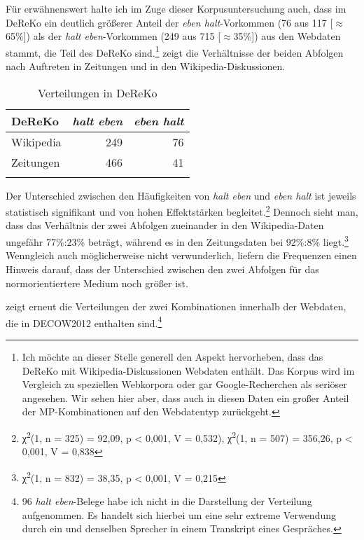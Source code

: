 Für erwähnenswert halte ich im Zuge dieser Korpusuntersuchung auch, dass im DeReKo ein deutlich größerer Anteil der \textit{eben halt}-Vorkommen (76 aus 117 [$\approx$65\%]) als der \textit{halt eben}-Vorkommen (249 aus 715 [$\approx$35\%]) aus den Webdaten stammt, die Teil des DeReKo sind.\footnote{Ich möchte an dieser Stelle generell den Aspekt hervorheben, dass das DeReKo mit Wikipedia-Diskussionen Webdaten enthält. Das Korpus wird im Vergleich zu speziellen Webkorpora oder gar Google-Recherchen als seriöser angesehen. Wir sehen hier aber, dass auch in diesen Daten ein großer Anteil der MP-Kom\-bi\-na\-ti\-on\-en auf den Webdatentyp zurückgeht.}  zeigt die Verhältnisse der beiden Abfolgen nach Auftreten in Zeitungen und in den Wikipedia-Diskussionen.

\begin{table}
\caption{\label{tab:624}Verteilungen in DeReKo}
     \begin{tabular}{lrr}
     \lsptoprule
     DeReKo & \textit{halt eben} & \textit{eben halt}\\\midrule
     Wikipedia & 249 & 76\\
     Zeitungen & 466 & 41\\
     \lspbottomrule
     \end{tabular}
\end{table}
Der Unterschied zwischen den Häufigkeiten von \textit{halt eben} und \textit{eben halt} ist je\-weils statistisch signifikant und von hohen Effektstärken begleitet.\footnote{χ\textsuperscript{2}(1, n = 325) = 92,09, p < 0,001, V = 0,532), χ\textsuperscript{2}(1, n = 507) = 356,26, p < 0,001, V = 0,838} Dennoch sieht man, dass das Verhältnis der zwei Abfolgen zueinander in den Wikipedia-Daten ungefähr 77\%:23\% beträgt, während es in den Zeitungsdaten bei 92\%:8\% liegt.\footnote{χ\textsuperscript{2}(1, n = 832) = 38,35, p < 0,001, V = 0,215} Wenngleich auch möglicherweise nicht verwunderlich, liefern die Frequenzen einen Hinweis darauf, dass der Unterschied zwischen den zwei Abfolgen für das normorientiertere Medium noch größer ist.

 zeigt erneut die Verteilungen der zwei Kombinationen innerhalb der Webdaten, die in DECOW2012 enthalten sind.\footnote{96 \textit{halt eben}-Belege habe ich nicht in die Darstellung der Verteilung aufgenommen. Es handelt sich hierbei um eine sehr extreme Verwendung durch ein und denselben Sprecher in einem Transkript eines Gespräches.}

